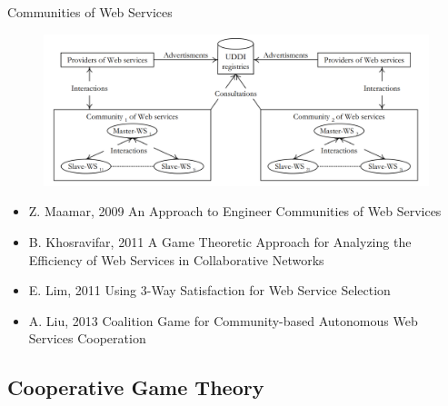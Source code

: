 \documentclass{beamer}
\begin{document}

\begin{frame}{Communities of Web Services}
    \begin{figure}[htbp]
        \centering
        \includegraphics[width=1.0 \columnwidth]{figures/wscommunity2.png}
    \end{figure}

    \tiny
    \begin{itemize}
      \item {\color{blue}\lbrack Z. Maamar, 2009\rbrack} An Approach to Engineer Communities of Web Services
      \item {\color{blue}\lbrack B. Khosravifar, 2011\rbrack} A Game Theoretic Approach for Analyzing the Efficiency of Web Services in Collaborative Networks
      \item {\color{blue}\lbrack E. Lim, 2011\rbrack} Using 3-Way Satisfaction for Web Service Selection
      \item {\color{blue}\lbrack A. Liu, 2013\rbrack} Coalition Game for Community-based Autonomous Web Services Cooperation
    \end{itemize}                      	      	
\end{frame}

\subsection{Cooperative Game Theory}
\end{document}
